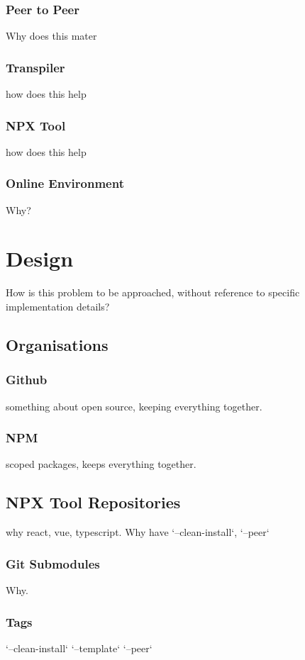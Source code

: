 \documentclass{l4proj}
\begin{document}
\subsection{Peer to Peer}
\text Why does this mater

\subsection{Transpiler}
\text how does this help

\subsection{NPX Tool}
\text how does this help

\subsection{Online Environment}
\text Why?
\chapter{Design}
How is this problem to be approached, without reference to specific implementation details? 
\section{Organisations}
\subsection{Github}
\text something about open source, keeping everything together.
\subsection{NPM}
\text scoped packages, keeps everything together.
\section{NPX Tool Repositories}
\text why react, vue, typescript. Why have `--clean-install`, `--peer`
\subsection{Git Submodules}
\text Why.
\subsection{Tags}
\text `--clean-install` `--template` `--peer`
\end{document}
